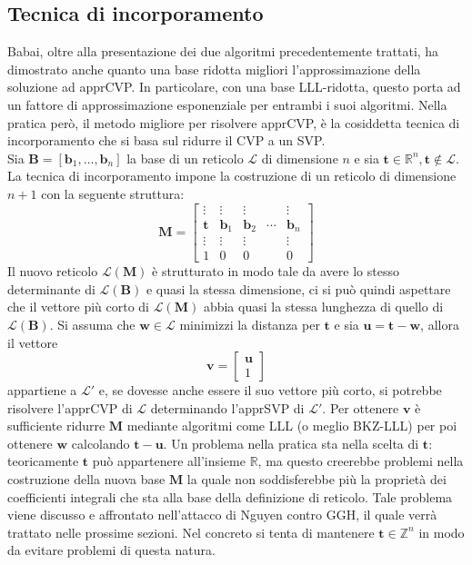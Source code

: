 \subsection{Tecnica di incorporamento}
Babai, oltre alla presentazione dei due algoritmi precedentemente trattati, ha dimostrato
anche quanto una base ridotta migliori l'approssimazione della soluzione ad apprCVP.
In particolare, con una base LLL-ridotta, questo porta ad un fattore di approssimazione
esponenziale per entrambi i suoi algoritmi. Nella pratica però, il metodo migliore per 
risolvere apprCVP, è la cosiddetta tecnica di
incorporamento\cite{Galbraith18} che si basa sul ridurre il CVP a un SVP.  
\\
Sia $\mathbf{B} = [\mathbf{b}_1,\dots, \mathbf{b}_n]$ la base di un reticolo $\mathcal{L}$
di dimensione $n$ e sia $\mathbf{t} \in \mathbb{R}^n, \mathbf{t} \notin \mathcal{L}$. 
La tecnica di incorporamento impone la costruzione di un reticolo di dimensione $n+1$ con
la seguente struttura:
\[
    \mathbf{M} =
    \begin{bmatrix}
        \vdots & \vdots & \vdots & & \vdots\\
        \mathbf{t} & \mathbf{b}_1 & \mathbf{b}_2 & \cdots & \mathbf{b}_n\\
        \vdots & \vdots & \vdots & & \vdots\\
        1 & 0 & 0 & & 0
    \end{bmatrix}
\]
Il nuovo reticolo $\mathcal{L}(\mathbf{M})$ è strutturato in modo tale da avere lo stesso 
determinante di $\mathcal{L}(\mathbf{B})$ e quasi la stessa dimensione, ci si può quindi 
aspettare che il vettore più corto di $\mathcal{L}(\mathbf{M})$ abbia quasi la stessa 
lunghezza di quello di $\mathcal{L}(\mathbf{B})$. Si assuma che $\mathbf{w} \in \mathcal{L}$
minimizzi la distanza per $\mathbf{t}$ e sia $\mathbf{u} = \mathbf{t}-\mathbf{w}$, allora il vettore
\[
    \mathbf{v} =
    \begin{bmatrix}
        \mathbf{u}\\
        1
    \end{bmatrix}
\]
appartiene a $\mathcal{L}'$ e, se dovesse anche essere il suo vettore più corto, si 
potrebbe risolvere l'apprCVP di $\mathcal{L}$ determinando l'apprSVP di $\mathcal{L}'$.
Per ottenere $\mathbf{v}$ è sufficiente ridurre $\mathbf{M}$
mediante algoritmi come LLL (o meglio BKZ-LLL) per poi ottenere $\mathbf{w}$ calcolando 
$\mathbf{t}-\mathbf{u}$.
Un problema nella pratica sta nella scelta di $\mathbf{t}$: teoricamente
$\mathbf{t}$ può appartenere all'insieme $\mathbb{R}$, ma questo creerebbe problemi nella
costruzione della nuova base $\mathbf{M}$ la quale non soddisferebbe più la proprietà dei 
coefficienti integrali che sta alla base della definizione di reticolo. Tale problema viene
discusso e affrontato nell'attacco di Nguyen contro GGH, il quale verrà trattato nelle prossime sezioni.
Nel concreto si tenta di mantenere $\mathbf{t} \in \mathbb{Z}^n$ in modo da evitare problemi
di questa natura.

